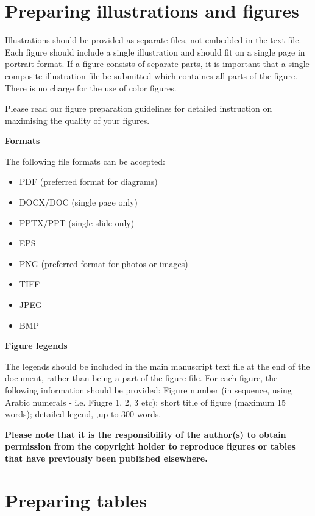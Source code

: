 \documentclass{EPS}
\begin{document}
\section{Preparing illustrations and figures}

Illustrations should be provided as separate files,
not embedded in the text file.
Each figure should include a single illustration and
should fit on a single page in portrait format.
If a figure consists of separate parts,
it is important that a single composite illustration file
be submitted which containes all parts of the figure.
There is no charge for the use of color figures.

Please read our figure preparation guidelines
for detailed instruction on maximising the quality of your figures.

\noindent
\textbf{Formats}

The following file formats can be accepted:
\begin{itemize}
\item PDF (preferred format for diagrams)
\item DOCX/DOC (single page only)
\item PPTX/PPT (single slide only)
\item EPS
\item PNG (preferred format for photos or images)
\item TIFF
\item JPEG
\item BMP
\end{itemize}

\noindent
\textbf{Figure legends}

The legends should be included in the main manuscript text file
at the end of the document, rather than being a part of the figure file.
For each figure, the following information should be provided:
Figure number (in sequence, using Arabic numerals -
i.e. Fiugre 1, 2, 3 etc); short title of figure (maximum 15 words);
detailed legend, ,up to 300 words.

\textbf{Please note that it is the responsibility of the author(s)
to obtain permission from the copyright holder
to reproduce figures or tables that have previously
been published elsewhere.
}

\section{Preparing tables}
\end{document}
